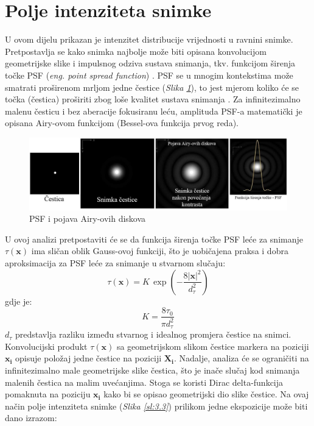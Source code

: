 \section{Polje intenziteta snimke}
U ovom dijelu prikazan je intenzitet distribucije vrijednosti u ravnini snimke. Pretpostavlja se kako snimka najbolje može biti opisana konvolucijom geometrijske slike i impulsnog odziva sustava snimanja, tkv. funkcijom širenja točke PSF (\textit{eng. point spread function}) \cite{raffel2018_book}. PSF se u mnogim kontekstima može smatrati proširenom mrljom jedne čestice (\textit{Slika \ref{sl:3.2}}), to jest mjerom koliko će se točka (čestica) proširiti zbog loše kvalitet sustava snimanja \cite{wiki:Point_spread_function}. Za infinitezimalno malenu česticu i bez aberacije fokusiranu leću, amplituda PSF-a matematički je opisana Airy-ovom funkcijom (Bessel-ova funkcija prvog reda).
\begin{figure}[h]  
	\centering
	\includegraphics[width=15cm]{./3_MatPozadina/3_2PSF.jpg} 
	\caption{PSF i pojava Airy-ovih diskova \cite{youtube_PSF}}
	\label{sl:3.2}
\end{figure}
\par
U ovoj analizi pretpostaviti će se da funkcija širenja točke PSF leće za snimanje $\tau (\boldsymbol{x})$ ima sličan oblik Gauss-ovoj funkciji, što je uobičajena praksa i dobra aproksimacija za PSF leće za snimanje u stvarnom slučaju:
\begin{equation}
	\tau (\boldsymbol{x}) = K \, \exp \left(-\dfrac{8|\boldsymbol{x}|^2}{d_{\tau}^{2}}\right)
	\label{eqn:3.4}
\end{equation}
gdje je:
\begin{equation*}
	K = \dfrac{8\tau_{0}}{\pi d_{\tau}^{2}}
\end{equation*}
$d_{\tau}$ predstavlja razliku između stvarnog i idealnog promjera čestice na snimci. Konvolucijski produkt $\tau (\boldsymbol{x})$ sa geometrijskom slikom čestice markera na poziciji $\boldsymbol{x_{i}}$ opisuje položaj jedne čestice na poziciji $\boldsymbol{X_{i}}$. Nadalje, analiza će se ograničiti na infinitezimalno male geometrijske slike čestica, što je inače slučaj kod snimanja malenih čestica na malim uvećanjima. Stoga se koristi Dirac delta-funkcija pomaknuta na poziciju $\boldsymbol{x_{i}}$ kako bi se opisao geometrijski dio slike čestice. Na ovaj način polje intenziteta snimke (\textit{Slika \ref{sl:3.3}}) prilikom jedne ekspozicije može biti dano izrazom:

